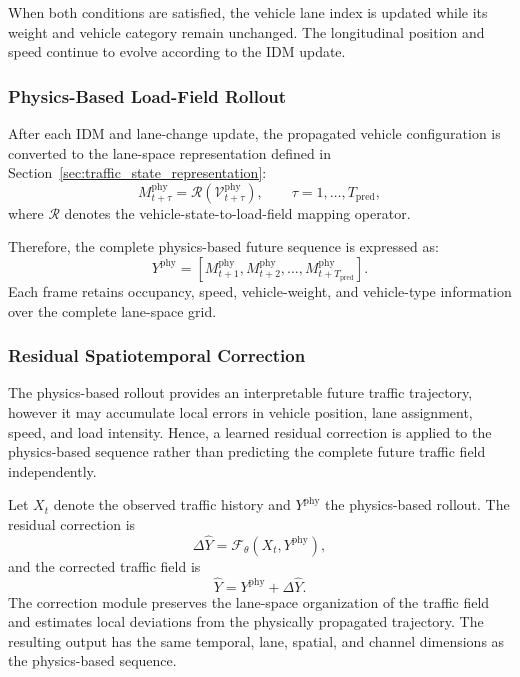 \documentclass[journal]{IEEEtran}
\begin{document}
When both conditions are satisfied, the vehicle lane index is updated while its weight and vehicle category remain unchanged. The longitudinal position and speed continue to evolve according to the IDM update.

\subsubsection{Physics-Based Load-Field Rollout}

After each IDM and lane-change update, the propagated vehicle configuration is converted to the lane-space representation defined in Section~\ref{sec:traffic_state_representation}:
\begin{equation}
M_{t+\tau}^{\mathrm{phy}} = \mathcal{R}\left(\mathcal{V}_{t+\tau}^{\mathrm{phy}}\right), \qquad \tau=1,\ldots,T_{\mathrm{pred}},
\end{equation}
where $\mathcal{R}$ denotes the vehicle-state-to-load-field mapping operator.

Therefore, the complete physics-based future sequence is expressed as:
\begin{equation}
Y^{\mathrm{phy}} = \left[M_{t+1}^{\mathrm{phy}},M_{t+2}^{\mathrm{phy}},\ldots,M_{t+T_{\mathrm{pred}}}^{\mathrm{phy}}\right].
\end{equation}
Each frame retains occupancy, speed, vehicle-weight, and vehicle-type information over the complete lane-space grid.

\subsubsection{Residual Spatiotemporal Correction}

The physics-based rollout provides an interpretable future traffic trajectory, however it may accumulate local errors in vehicle position, lane assignment, speed, and load intensity. Hence, a learned residual correction is applied to the physics-based sequence rather than predicting the complete future traffic field independently.

Let $X_t$ denote the observed traffic history and $Y^{\mathrm{phy}}$ the physics-based rollout. The residual correction is
\begin{equation}
\Delta\widehat{Y} = \mathcal{F}_{\theta}\left(X_t,Y^{\mathrm{phy}}\right),
\end{equation}
and the corrected traffic field is
\begin{equation}
\widehat{Y} = Y^{\mathrm{phy}}+\Delta\widehat{Y}.
\end{equation}
The correction module preserves the lane-space organization of the traffic field and estimates local deviations from the physically propagated trajectory. The resulting output has the same temporal, lane, spatial, and channel dimensions as the physics-based sequence.
\end{document}
